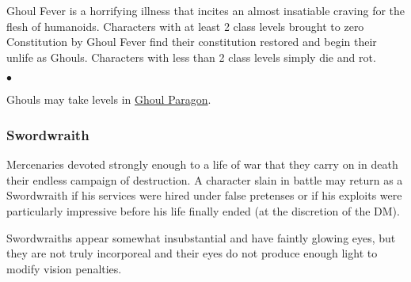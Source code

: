 Ghoul Fever is a horrifying illness that incites an almost insatiable craving for the flesh of humanoids. Characters with at least 2 class levels brought to zero Constitution by Ghoul Fever find their constitution restored and begin their unlife as Ghouls. Characters with less than 2 class levels simply die and rot.

\begin{list}{$\bullet$}{\itemspace}
\end{list}\vspace*{8pt}


Ghouls may take levels in \hyperref[class:ghoulparagon]{Ghoul Paragon}.

\subsubsection{Swordwraith} \label{undead:swordwraith}
\vspace*{-8pt}

Mercenaries devoted strongly enough to a life of war that they carry on in death their endless campaign of destruction. A character slain in battle may return as a Swordwraith if his services were hired under false pretenses or if his exploits were particularly impressive before his life finally ended (at the discretion of the DM).

Swordwraiths appear somewhat insubstantial and have faintly glowing eyes, but they are not truly incorporeal and their eyes do not produce enough light to modify vision penalties.

